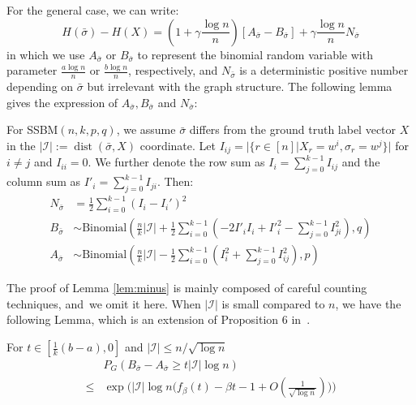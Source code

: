 \documentclass[entropy,article,accept,moreauthors,pdftex]{Definitions/mdpi}
\newcommand{\A}{\frac{a \log n}{n}}
\newcommand{\B}{\frac{b \log n}{n}}
\newcommand{\cI}{\mathcal{I}}
\newcommand{\1}{\mathbbm{1}}
\DeclareMathOperator{\Dist}{dist}
\begin{document}
\begin{paracol}{2}
For the general case, we can write:
\begin{equation}\label{eq:Hgeneral}
H(\bar{\sigma}) - H(X)=
(1 + \gamma \frac{ \log n}{n})[A_{\bar{\sigma}} - B_{\bar{\sigma}}] + \gamma\frac{ \log n}{n} N_{\bar{\sigma}}
\end{equation}
in which we use $A_{\bar{\sigma}}$ or $B_{\bar{\sigma}}$ to represent the binomial random variable with parameter $\A$ or $\B$,
respectively, and $N_{\bar{\sigma}}$ is a deterministic positive number depending on $\bar{\sigma}$ but irrelevant with the graph structure.
The following lemma gives the expression of $A_{\bar{\sigma}}, B_{\bar{\sigma}}$ and $N_{\bar{\sigma}}$:
\begin{Lemma}\label{lem:minus}
	For SSBM$(n,k,p,q)$, we assume $\bar{\sigma}$ differs from the ground truth label vector $X$ in the $|\cI|:=\Dist(\bar{\sigma}, X)$ coordinate.
	Let $I_{ij} = |\{r\in [n] | X_r = w^i, \sigma_r = w^j \}|$ for $i\neq j$ and $I_{ii} = 0$. We further denote the row sum as $I_i = \sum_{j=0}^{k-1} I_{ij}$ and
	the column sum as $I'_i = \sum_{j=0}^{k-1} I_{ji}$.
	Then:
\begin{align}
	N_{\bar{\sigma}} &= \frac{1}{2}\sum_{i=0}^{k-1} (I_i - I_i')^2 \label{eq:N_w} \\
	B_{\bar{\sigma}} & \sim \textrm{Binomial}(\frac{n}{k}|\cI| + \frac{1}{2}\sum_{i=0}^{k-1}  (-2 I'_i I_i  + I'^2_i - \sum_{j=0}^{k-1} I^2_{ji}) , q)\\
	A_{\bar{\sigma}} & \sim \textrm{Binomial}(\frac{n}{k}|\cI| - \frac{1}{2}\sum_{i=0}^{k-1}  (I^2_i + \sum_{j=0}^{k-1} I^2_{ij}), p) \label{eq:A_w}
	\end{align}
\end{Lemma}
The proof of Lemma \ref{lem:minus} is mainly composed of careful counting techniques, and~we omit it here.
When $|\cI|$ is small compared to $n$, we have the following Lemma, which is an extension of Proposition 6 in~\cite{ye2020exact}. 
\begin{Lemma}\label{lem:enhanced_fb}
	For $t\in [\frac{1}{k}(b-a), 0]$
	and $ |\cI| \le n/\sqrt{\log n}$
\begin{equation} \label{eq:upmpt}
	\begin{aligned}
	& P_G(B_{\bar{\sigma}}-A_{\bar{\sigma}}\ge t |\cI| \log n)  \\
	\le & \exp\Big(|\cI|\log n
	\Big(f_{\beta}(t) - \beta t -1	+ O(\frac{1}{\sqrt{\log n}}) \Big)\Big)
	\end{aligned}
	\end{equation}

\end{Lemma}
\end{paracol}
\end{document}

